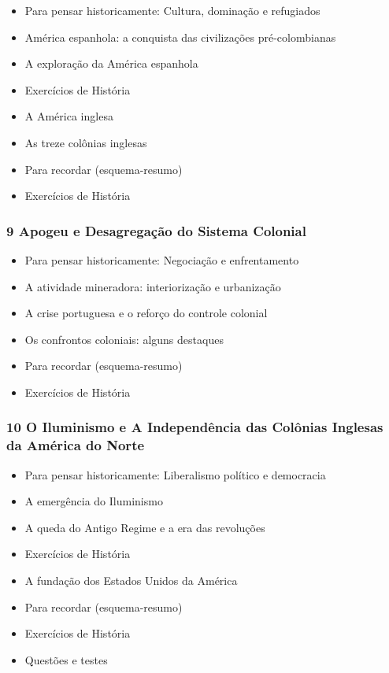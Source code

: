 \documentclass[a4paper,12pt]{article}[abntex2]
\begin{document}
\begin{itemize}
\item Para pensar historicamente: Cultura, dominação e refugiados
\item América espanhola: a conquista das civilizações pré-colombianas
\item A exploração da América espanhola
\item Exercícios de História
\item A América inglesa
\item As treze colônias inglesas
\item Para recordar (esquema-resumo)
\item Exercícios de História
\end{itemize}
\subsubsection*{9 Apogeu e Desagregação do Sistema Colonial}

\begin{itemize}
\item Para pensar historicamente: Negociação e enfrentamento
\item A atividade mineradora: interiorização e urbanização
\item A crise portuguesa e o reforço do controle colonial
\item Os confrontos coloniais: alguns destaques
\item Para recordar (esquema-resumo)
\item Exercícios de História
\end{itemize}
\subsubsection*{10 O Iluminismo e A Independência das Colônias Inglesas da América do Norte}

\begin{itemize}
\item Para pensar historicamente: Liberalismo político e democracia
\item A emergência do Iluminismo
\item A queda do Antigo Regime e a era das revoluções
\item Exercícios de História
\item A fundação dos Estados Unidos da América
\item Para recordar (esquema-resumo)
\item Exercícios de História
\item Questões e testes
\end{itemize}
\end{document}
